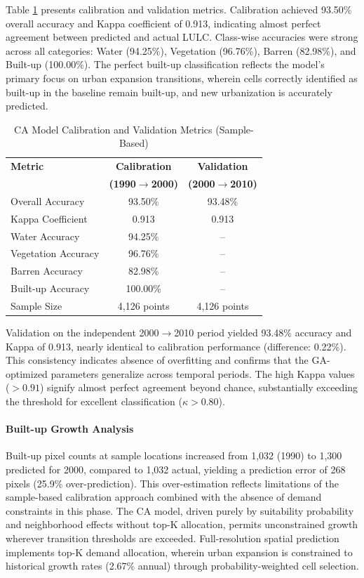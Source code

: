 \documentclass[12pt,a4paper]{article}
\begin{document}
Table \ref{tab:ca_calibration} presents calibration and validation metrics. Calibration achieved 93.50\% overall accuracy and Kappa coefficient of 0.913, indicating almost perfect agreement between predicted and actual LULC. Class-wise accuracies were strong across all categories: Water (94.25\%), Vegetation (96.76\%), Barren (82.98\%), and Built-up (100.00\%). The perfect built-up classification reflects the model's primary focus on urban expansion transitions, wherein cells correctly identified as built-up in the baseline remain built-up, and new urbanization is accurately predicted.

\begin{table}[H]
\caption{CA Model Calibration and Validation Metrics (Sample-Based)}
\label{tab:ca_calibration}
\centering
\small
\renewcommand{\arraystretch}{1.2}
\begin{tabular}{lcc}
\toprule
\textbf{Metric} & \textbf{Calibration} & \textbf{Validation} \\
 & \textbf{(1990$\rightarrow$2000)} & \textbf{(2000$\rightarrow$2010)} \\
\midrule
Overall Accuracy & 93.50\% & 93.48\% \\
Kappa Coefficient & 0.913 & 0.913 \\
Water Accuracy & 94.25\% & -- \\
Vegetation Accuracy & 96.76\% & -- \\
Barren Accuracy & 82.98\% & -- \\
Built-up Accuracy & 100.00\% & -- \\
\midrule
Sample Size & 4,126 points & 4,126 points \\
\bottomrule
\end{tabular}
\end{table}

Validation on the independent 2000$\rightarrow$2010 period yielded 93.48\% accuracy and Kappa of 0.913, nearly identical to calibration performance (difference: 0.22\%). This consistency indicates absence of overfitting and confirms that the GA-optimized parameters generalize across temporal periods. The high Kappa values ($>0.91$) signify almost perfect agreement beyond chance, substantially exceeding the threshold for excellent classification ($\kappa > 0.80$).

\paragraph{Built-up Growth Analysis}

Built-up pixel counts at sample locations increased from 1,032 (1990) to 1,300 predicted for 2000, compared to 1,032 actual, yielding a prediction error of 268 pixels (25.9\% over-prediction). This over-estimation reflects limitations of the sample-based calibration approach combined with the absence of demand constraints in this phase. The CA model, driven purely by suitability probability and neighborhood effects without top-K allocation, permits unconstrained growth wherever transition thresholds are exceeded. Full-resolution spatial prediction implements top-K demand allocation, wherein urban expansion is constrained to historical growth rates (2.67\% annual) through probability-weighted cell selection.
\end{document}

